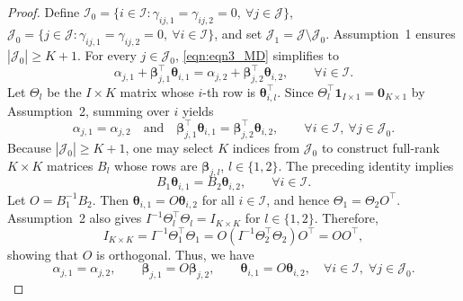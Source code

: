 \documentclass[11pt]{article}
\begin{document}
\begin{proof}
Define $\mathcal{I}_0 = \{ i\in\mathcal{I} : \gamma_{ij,1}=\gamma_{ij,2}=0,\ \forall j\in\mathcal{J}\}$, $\mathcal{J}_0 = \{ j\in\mathcal{J} : \gamma_{ij,1}=\gamma_{ij,2}=0,\ \forall i\in\mathcal{I}\}$, and set $\mathcal{J}_1=\mathcal{J}\setminus\mathcal{J}_0$.
Assumption~1 ensures $|\mathcal{J}_0|\ge K+1$.
For every $j\in\mathcal{J}_0$, \eqref{eqn:eqn3_MD} simplifies to
\begin{equation*}
    \alpha_{j,1} + \boldsymbol{\beta}_{j,1}^\top\boldsymbol{\theta}_{i,1}
    =
    \alpha_{j,2} + \boldsymbol{\beta}_{j,2}^\top\boldsymbol{\theta}_{i,2},
    \qquad \forall i\in\mathcal{I}.
\end{equation*}
Let $\Theta_l$ be the $I\times K$ matrix whose $i$-th row is $\boldsymbol{\theta}_{i,l}^\top$.
Since $\Theta_l^\top \boldsymbol{1}_{I\times 1}=\boldsymbol{0}_{K\times 1}$ by Assumption~2,
summing over $i$ yields
\begin{equation*}
    \alpha_{j,1}=\alpha_{j,2}
    \quad\text{and}\quad
    \boldsymbol{\beta}_{j,1}^\top\boldsymbol{\theta}_{i,1}
    =
    \boldsymbol{\beta}_{j,2}^\top\boldsymbol{\theta}_{i,2},
    \qquad \forall i\in\mathcal{I},\ \forall j\in\mathcal{J}_0.
\end{equation*}
Because $|\mathcal{J}_0|\ge K+1$, one may select $K$ indices from $\mathcal{J}_0$ to construct full-rank
$K\times K$ matrices $B_l$ whose rows are $\boldsymbol{\beta}_{j,l}$, $l\in\{1,2\}$.
The preceding identity implies
\begin{equation*}
    B_1\boldsymbol{\theta}_{i,1} = B_2\boldsymbol{\theta}_{i,2},
    \qquad \forall i\in\mathcal{I}.
\end{equation*}
Let $O=B_1^{-1}B_2$. Then $\boldsymbol{\theta}_{i,1}=O\boldsymbol{\theta}_{i,2}$ for all $i\in\mathcal{I}$, and hence $\Theta_1=\Theta_2O^\top$.
Assumption~2 also gives $I^{-1}\Theta_l^\top\Theta_l=I_{K\times K}$ for $l\in\{1,2\}$.  
Therefore,
\begin{equation*}
    I_{K\times K}
    =
    I^{-1}\Theta_1^\top\Theta_1
    =
    O(I^{-1}\Theta_2^\top\Theta_2)O^\top
    =
    OO^\top,
\end{equation*}
showing that $O$ is orthogonal. Thus, we have
\begin{equation*}
    \alpha_{j,1}=\alpha_{j,2},
    \qquad
    \boldsymbol{\beta}_{j,1}=O\boldsymbol{\beta}_{j,2},
    \qquad
    \boldsymbol{\theta}_{i,1}=O\boldsymbol{\theta}_{i,2},
    \quad \forall i\in\mathcal{I},\; \forall j \in \mathcal{J}_0.
\end{equation*}


\end{proof}
\end{document}
